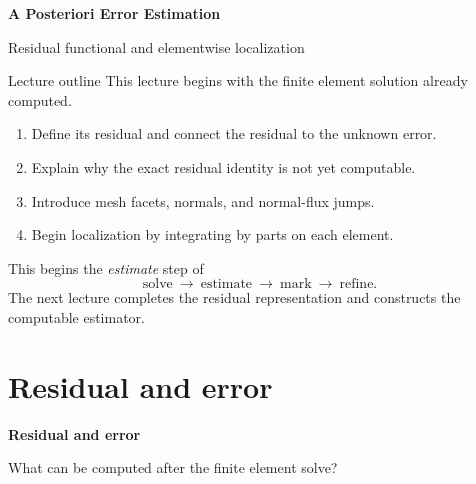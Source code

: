 \documentclass[11pt,aspectratio=169]{beamer}
\begin{document}
\begin{frame}[plain]
  \centering\vfill
  {\LARGE\bfseries A Posteriori Error Estimation\par}
  \vspace{0.45cm}
  {\large Residual functional and elementwise localization\par}
  \vfill
\end{frame}

\begin{frame}{Lecture outline}
This lecture begins with the finite element solution already computed.

\begin{enumerate}
  \item Define its residual and connect the residual to the unknown error.
  \item Explain why the exact residual identity is not yet computable.
  \item Introduce mesh facets, normals, and normal-flux jumps.
  \item Begin localization by integrating by parts on each element.
\end{enumerate}

\vspace{0.35cm}
This begins the \emph{estimate} step of
\[
  \text{solve}\ \longrightarrow\ \text{estimate}\ \longrightarrow\
  \text{mark}\ \longrightarrow\ \text{refine}.
\]
The next lecture completes the residual representation and constructs the
computable estimator.
\end{frame}

\section{Residual and error}

\begin{frame}[plain]
  \centering\vfill
  {\LARGE\bfseries Residual and error\par}
  \vspace{0.4cm}
  {\large What can be computed after the finite element solve?\par}
  \vfill
\end{frame}
\end{document}
